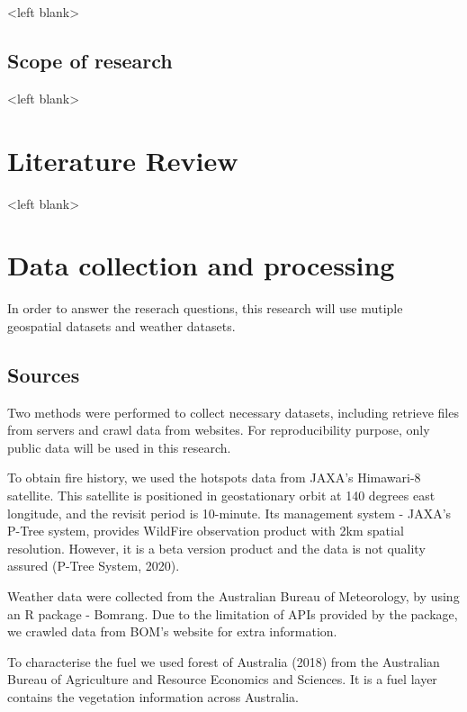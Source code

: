 \documentclass{monashthesis}
\begin{document}
\textless{}left blank\textgreater{}

\section{Scope of research}\label{scope-of-research}

\textless{}left blank\textgreater{}

\chapter{Literature Review}\label{literature-review}

\textless{}left blank\textgreater{}

\chapter{Data collection and
processing}\label{data-collection-and-processing}

In order to answer the reserach questions, this research will use
mutiple geospatial datasets and weather datasets.

\section{Sources}\label{sources}

Two methods were performed to collect necessary datasets, including
retrieve files from servers and crawl data from websites. For
reproducibility purpose, only public data will be used in this research.

To obtain fire history, we used the hotspots data from JAXA's Himawari-8
satellite. This satellite is positioned in geostationary orbit at 140
degrees east longitude, and the revisit period is 10-minute. Its
management system - JAXA's P-Tree system, provides WildFire observation
product with 2km spatial resolution. However, it is a beta version
product and the data is not quality assured (P-Tree System, 2020).

Weather data were collected from the Australian Bureau of Meteorology,
by using an R package - Bomrang. Due to the limitation of APIs provided
by the package, we crawled data from BOM's website for extra
information.

To characterise the fuel we used forest of Australia (2018) from the
Australian Bureau of Agriculture and Resource Economics and Sciences. It
is a fuel layer contains the vegetation information across Australia.
\end{document}
